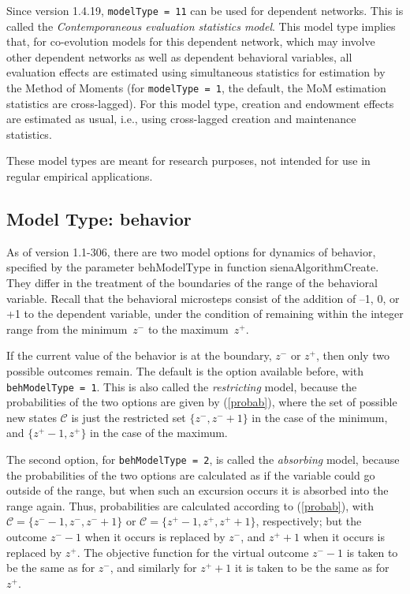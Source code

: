 \documentclass[a4paper,fleqn,11pt]{article}
\newcommand{\+}{\, + \,}
\newcommand{\sfn}[1]{\textsf{#1}}
\begin{document}
Since version 1.4.19,  \texttt{modelType = 11} can be used for dependent
networks. This is called the
\emph{Contemporaneous evaluation statistics model}.
This model type implies that, for co-evolution models for this dependent network,
which may involve other dependent networks as well as dependent behavioral
variables, all evaluation effects are estimated using simultaneous statistics
for estimation by the Method of Moments
(for \texttt{modelType = 1}, the default, the MoM estimation statistics
are cross-lagged).
For this model type, creation and endowment effects are estimated as usual,
i.e., using cross-lagged creation and maintenance statistics.
\medskip

These model types are meant for research purposes,
not intended for use in regular empirical applications.


\subsection{Model Type: behavior}
\label{S_modeltype_beh}

As of version 1.1-306, there are two model options for dynamics
of behavior, specified by the parameter \sfn{behModelType} in function
\textsf{sienaAlgorithmCreate}.
They differ in the treatment of the boundaries of the range of
the behavioral variable.
Recall that the behavioral microsteps consist of the addition
of --1, 0, or +1 to the dependent variable, under the condition
of remaining within the integer range from the minimum~$z^-$ to
the maximum~$z^+$.

If the current value of the behavior is at the boundary,
$z^-$ or $z^+$, then only two possible outcomes remain.
The default is the option available before, with
\texttt{behModelType = 1}. This is also called the \emph{restricting}
model, because the probabilities of the two options are given by
(\ref{probab}), where the set of possible new states
$\mathcal C$ is just the restricted set $\{z^-, z^-+1\}$ in the case
of the minimum, and $\{z^+-1, z^+\}$ in the case of the maximum.

The second option, for
\texttt{behModelType = 2}, is called the \emph{absorbing}
model, because the probabilities of the two options are calculated
as if the variable could go outside of the range, but when such an excursion
occurs it is absorbed into the range again.
Thus, probabilities are calculated according to
(\ref{probab}), with
$\mathcal C = \{z^--1, z^-, z^-+1\}$ or
$\mathcal C = \{z^+-1, z^+, z^++1\}$,
respectively; but the outcome $z^--1$ when it occurs is replaced
by $z^-$, and  $z^++1$ when it occurs is replaced
by $z^+$.
The objective function for the virtual outcome $z^--1$
is taken to be the same as for $z^-$, and similarly for $z^++1$
it is taken to be the same as for $z^+$.
\end{document}
